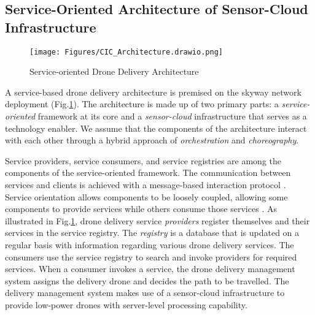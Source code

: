 \documentclass[conference]{IEEEtran}
\begin{document}



\subsection{Service-Oriented Architecture of Sensor-Cloud Infrastructure}

\begin{figure} [htp!]
    \centering
    \texttt{[image: Figures/CIC\_Architecture.drawio.png]}
    \caption{Service-oriented Drone Delivery Architecture}
    \label{Architecture}
\end{figure}

A service-based drone delivery architecture is premised on the skyway network deployment (Fig.\ref{Architecture}). The architecture is made up of two primary parts: a \textit{service-oriented} framework at its core and a \textit{sensor-cloud} infrastructure that serves as a technology enabler. We assume that the components of the architecture interact with each other through a hybrid approach of \textit{orchestration} and \textit{choreography}.

Service providers, service consumers, and service registries are among the components of the service-oriented framework. The communication between services and clients is achieved with a message-based interaction protocol \cite{alshinina2017performance}. Service orientation allows components to be loosely coupled, allowing some components to provide services while others consume those services \cite{jana2006service}. As illustrated in Fig.\ref{Architecture}, drone delivery service \textit{providers} register themselves and their services in the service registry. The \textit{registry} is a database that is updated on a regular basis with information regarding various drone delivery services. The consumers use the service registry to search and invoke providers for required services. When a consumer invokes a service, the drone delivery management system assigns the delivery drone and decides the path to be travelled. The delivery management system makes use of a sensor-cloud infrastructure to provide low-power drones with server-level processing capability.
\end{document}
